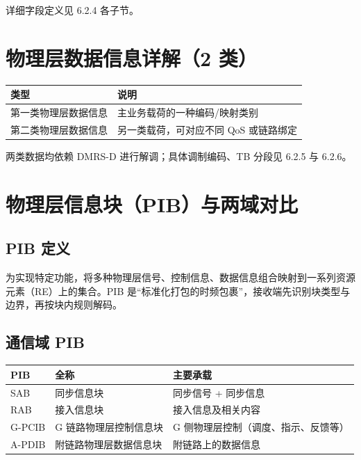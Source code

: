\documentclass[11pt,a4paper]{ctexart}
\begin{document}
详细字段定义见 6.2.4 各子节。

\section{物理层数据信息详解（2 类）}

\begin{table}[h]
\centering
\small
\begin{tabular}{ll}
\toprule
\textbf{类型} & \textbf{说明} \\
\midrule
第一类物理层数据信息 & 主业务载荷的一种编码/映射类别 \\
第二类物理层数据信息 & 另一类载荷，可对应不同 QoS 或链路绑定 \\
\bottomrule
\end{tabular}
\end{table}

两类数据均依赖 DMRS-D 进行解调；具体调制编码、TB 分段见 6.2.5 与 6.2.6。

\section{物理层信息块（PIB）与两域对比}

\subsection{PIB 定义}

为实现特定功能，将多种物理层信号、控制信息、数据信息组合映射到一系列资源元素（RE）上的集合。PIB 是``标准化打包的时频包裹''，接收端先识别块类型与边界，再按块内规则解码。

\subsection{通信域 PIB}

\begin{table}[h]
\centering
\small
\begin{tabular}{lll}
\toprule
\textbf{PIB} & \textbf{全称} & \textbf{主要承载} \\
\midrule
SAB & 同步信息块 & 同步信号 + 同步信息 \\
RAB & 接入信息块 & 接入信息及相关内容 \\
G-PCIB & G 链路物理层控制信息块 & G 侧物理层控制（调度、指示、反馈等） \\
A-PDIB & 附链路物理层数据信息块 & 附链路上的数据信息 \\
\bottomrule
\end{tabular}
\end{table}
\end{document}
